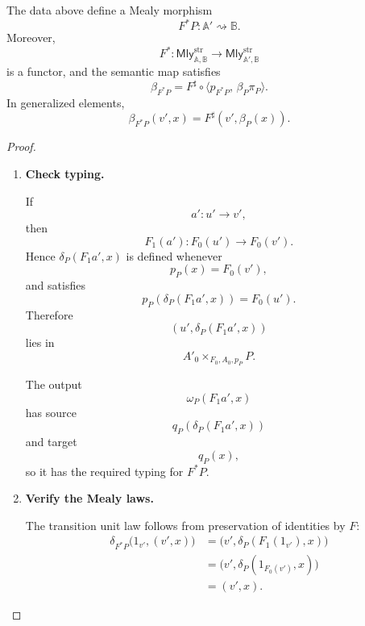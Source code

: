 \begin{proposition}
\label{prop:input-pullback-mealy}
    The data above define a Mealy morphism
    \[
        F^*P:\mathbb A'\rightsquigarrow\mathbb B.
    \]
    Moreover,
    \[
        F^*:\mathsf{Mly}^{\mathrm{str}}_{\mathbb A,\mathbb B}
        \to
        \mathsf{Mly}^{\mathrm{str}}_{\mathbb A',\mathbb B}
    \]
    is a functor, and the semantic map satisfies
    \[
        \beta_{F^*P}
        =
        F^\sharp
        \circ
        \langle p_{F^*P},\,\beta_P\pi_P\rangle.
    \]
    In generalized elements,
    \[
        \beta_{F^*P}(v',x)
        =
        F^\sharp(v',\beta_P(x)).
    \]
\end{proposition}
\begin{proof}
    \leavevmode
    \begin{enumerate}
        \item \textbf{Check typing.}

        If
        \[
            a':u'\to v',
        \]
        then
        \[
            F_1(a'):F_0(u')\to F_0(v').
        \]
        Hence \(\delta_P(F_1a',x)\) is defined whenever
        \[
            p_P(x)=F_0(v'),
        \]
        and satisfies
        \[
            p_P(\delta_P(F_1a',x))=F_0(u').
        \]
        Therefore
        \[
            (u',\delta_P(F_1a',x))
        \]
        lies in
        \[
            A'_0\times_{F_0,A_0,p_P}P.
        \]

        The output
        \[
            \omega_P(F_1a',x)
        \]
        has source
        \[
            q_P(\delta_P(F_1a',x))
        \]
        and target
        \[
            q_P(x),
        \]
        so it has the required typing for \(F^*P\).

        \item \textbf{Verify the Mealy laws.}

        The transition unit law follows from preservation of identities by
        \(F\):
        \[
        \begin{aligned}
            \delta_{F^*P}
            \bigl(
                1_{v'},
                (v',x)
            \bigr)
            &=
            \bigl(
                v',
                \delta_P(F_1(1_{v'}),x)
            \bigr)
            \\
            &=
            \bigl(
                v',
                \delta_P(1_{F_0(v')},x)
            \bigr)
            \\
            &=
            (v',x).
        \end{aligned}
        \]


\end{enumerate}
\end{proof}
